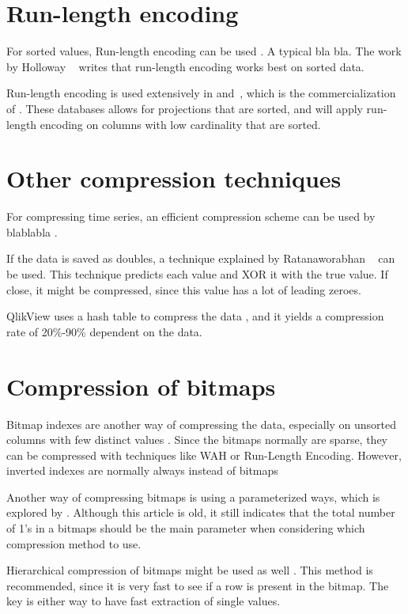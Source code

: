 \section{Run-length encoding}
\label{sec:Run-length encoding}
For sorted values, Run-length encoding can be used \cite{Bjorklund2011-wh}. A typical bla bla. The work by Holloway \ea~\cite{Holloway2008-rr} writes that run-length encoding works best on sorted data.

Run-length encoding is used extensively in \cstore and\vertica~\cite{Barber2012-xt}, which is the commercialization of \cstore. These databases allows for projections that are sorted, and will apply run-length encoding on columns with low cardinality that are sorted.

\section{Other compression techniques}
\label{sec:Other compression techniques}
For compressing time series, an efficient compression scheme can be used by blablabla \cite{Pelkonen2015-ko}.

If the data is saved as doubles, a technique explained by Ratanaworabhan \ea~\cite{Ratanaworabhan2006-wb} can be used. This technique predicts each value and XOR it with the true value. If close, it might be compressed, since this value has a lot of leading zeroes.

QlikView uses a hash table to compress the data \cite{Qlik2014-vd}, and it yields a compression rate of 20\%-90\% dependent on the data.

\section{Compression of bitmaps}
\label{sec:Compression of bitmaps}
Bitmap indexes are another way of compressing the data, especially on unsorted columns with few distinct values \cite{Stonebraker2005-qz}. Since the bitmaps normally are sparse, they can be compressed with techniques like WAH \cite{Bjorklund2011-wh} or Run-Length Encoding. However, inverted indexes are normally always instead of bitmaps \cite{Witten1999-qq}

Another way of compressing bitmaps is using a parameterized ways, which is explored by \cite{Moffat1992-tz}. Although this article is old, it still indicates that the total number of 1's in a bitmaps should be the main parameter when considering which compression method to use.

Hierarchical compression of bitmaps might be used as well \cite{Witten1999-qq}. This method is recommended, since it is very fast to see if a row is present in the bitmap. The key is either way to have fast extraction of single values.

